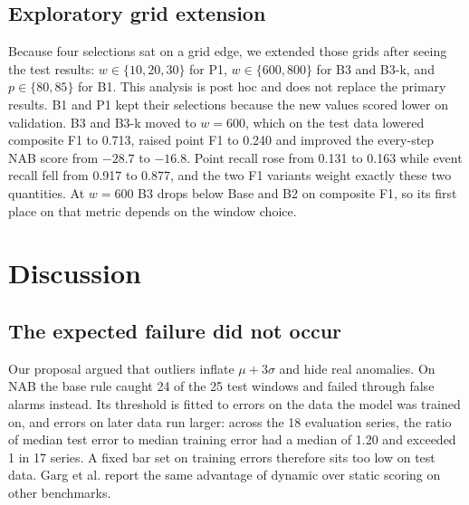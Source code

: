 \documentclass[conference]{IEEEtran}
\begin{document}
\subsection{Exploratory grid extension}
\label{sec:explore}
Because four selections sat on a grid edge, we extended those grids after seeing the test results: $w \in \{10, 20, 30\}$ for P1, $w \in \{600, 800\}$ for B3 and B3-k, and $p \in \{80, 85\}$ for B1. This analysis is post hoc and does not replace the primary results. B1 and P1 kept their selections because the new values scored lower on validation. B3 and B3-k moved to $w = 600$, which on the test data lowered composite F1 to 0.713, raised point F1 to 0.240 and improved the every-step NAB score from $-28.7$ to $-16.8$. Point recall rose from 0.131 to 0.163 while event recall fell from 0.917 to 0.877, and the two F1 variants weight exactly these two quantities. At $w = 600$ B3 drops below Base and B2 on composite F1, so its first place on that metric depends on the window choice.

\section{Discussion}
\subsection{The expected failure did not occur}
\label{sec:drift}
Our proposal argued that outliers inflate $\mu + 3\sigma$ and hide real anomalies. On NAB the base rule caught 24 of the 25 test windows and failed through false alarms instead. Its threshold is fitted to errors on the data the model was trained on, and errors on later data run larger: across the 18 evaluation series, the ratio of median test error to median training error had a median of 1.20 and exceeded 1 in 17 series. A fixed bar set on training errors therefore sits too low on test data. Garg et al. \cite{garg2022} report the same advantage of dynamic over static scoring on other benchmarks.
\end{document}
